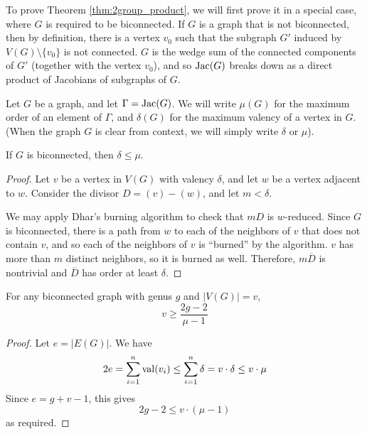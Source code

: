 \documentclass{amsart}
\begin{document}
To prove Theorem \ref{thm:2group_product}, we will first prove it in a
special case, where $G$ is required to be biconnected. If $G$ is a
graph that is not biconnected, then by definition, there is a vertex
$v_0$ such that the subgraph $G'$ induced by $V(G) \setminus \{v_0\}$
is not connected. $G$ is the wedge sum of the connected components of
$G'$ (together with the vertex $v_0$), and so $\operatorname{Jac}(G)$ breaks down as
a direct product of Jacobians of subgraphs of $G$.

\begin{defn}
  Let $G$ be a graph, and let $\Gamma = \operatorname{Jac}(G)$. We will write $\mu(G)$
  for the maximum order of an element of $\Gamma$, and $\delta(G)$ for
  the maximum valency of a vertex in $G$. (When the graph $G$ is clear
  from context, we will simply write $\delta$ or $\mu$). 
\end{defn}

\begin{lem}
  \label{lem:delta_le_mu}
  If $G$ is biconnected, then $\delta \le \mu$.
\end{lem}
\begin{proof}
  Let $v$ be a vertex in $V(G)$ with valency $\delta$, and let $w$ be
  a vertex adjacent to $w$. Consider the divisor $D = (v) -
  (w)$, and let $m < \delta$. 

  We may apply Dhar's burning algorithm to check that $mD$ is
  $w$-reduced. Since $G$ is biconnected, there is a path from $w$ to
  each of the neighbors of $v$ that does not contain $v$, and so each
  of the neighbors of $v$ is ``burned'' by the algorithm. $v$ has more
  than $m$ distinct neighbors, so it is burned as well. Therefore,
  $m\overline{D}$ is nontrivial and $\overline{D}$ has order at least
  $\delta$.
\end{proof}

\begin{cor}
  \label{cor:genus_v_mu}
  For any biconnected graph with genus $g$ and $|V(G)| = v$,
  \begin{equation*}
    v \ge \frac{2g - 2}{\mu - 1}
  \end{equation*}
\end{cor}
\begin{proof}
  Let $e = |E(G)|$. We have 
  \begin{equation}
    2e = \sum_{i=1}^n \operatorname{val}(v_i) \le \sum_{i=1}^n \delta = v \cdot \delta
    \le v \cdot \mu
  \end{equation}
  Since $e = g + v - 1$, this gives
  \begin{equation}
    2g - 2 \le v \cdot (\mu - 1)
  \end{equation}
  as required.

\end{proof}
\end{document}
